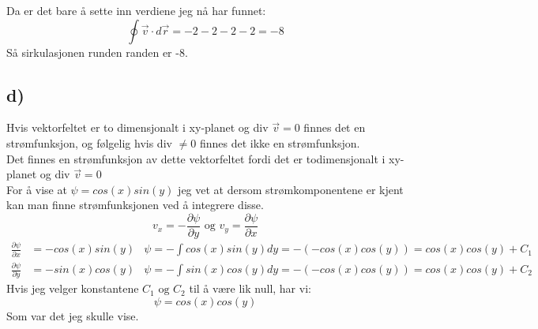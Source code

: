 \documentclass[a4paper,12pt,norsk]{article}
\begin{document}
Da er det bare å sette inn verdiene jeg nå har funnet:
$$\oint \vec{v} \cdot d\vec{r} = -2 -2 -2 -2 = -8$$
Så sirkulasjonen runden randen er -8.

\subsection{d)}
Hvis vektorfeltet er to dimensjonalt i xy-planet og div $\vec{v} = 0$ finnes det en strømfunksjon, og følgelig hvis div $\neq 0$ finnes det ikke en strømfunksjon. \\
Det finnes en strømfunksjon av dette vektorfeltet fordi det er todimensjonalt i xy-planet og div $\vec{v}= 0$\\
For å vise at $\psi = cos(x)sin(y)$ jeg vet at dersom strømkomponentene er kjent kan man finne strømfunksjonen ved å integrere disse. 
$$ v_x = -\frac{\partial{\psi}}{\partial{y}} \textrm{ og } v_y = \frac{\partial{\psi}}{\partial{x}}$$
\begin{align*}
\frac{\partial{\psi}}{\partial{x}} &= -cos(x)sin(y) &\psi = -\int cos(x)sin(y)dy = -(-cos(x)cos(y)) = cos(x)cos(y) + C_1\\
\frac{\partial{\psi}}{\partial{y}} &= -sin(x)cos(y) &\psi = -\int sin(x)cos(y)dy = -(-cos(x)cos(y)) = cos(x)cos(y) + C_2
\end{align*}
Hvis jeg velger konstantene $C_1\textrm{ og } C_2$ til å være lik null, har vi:
$$\psi = cos(x)cos(y)$$
Som var det jeg skulle vise.
\end{document}
